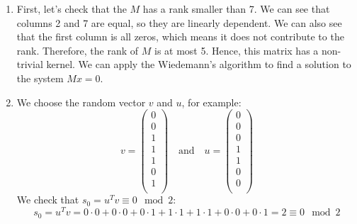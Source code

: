 \documentclass[a4paper, 11pt]{article}
\begin{document}
\begin{enumerate}
    \item First, let's check that the $M$ has a rank smaller than 7. We can see that columns 2 and 7 are equal, so they are linearly dependent. We can also see that the first column is all zeros, which means it does not contribute to the rank. Therefore, the rank of $M$ is at most 5. Hence, this matrix has a non-trivial kernel. We can apply the Wiedemann's algorithm to find a solution to the system $Mx = 0$.
    \item We choose the random vector $v$ and $u$, for example:
    \begin{equation}
        v = \begin{pmatrix}
            0 \\
            0 \\
            1 \\
            1 \\
            1 \\
            0 \\
            1 \\
        \end{pmatrix}
        \quad \text{and} \quad
        u = \begin{pmatrix}
            0 \\
            0 \\
            0 \\
            1 \\
            1 \\
            0 \\
            0 \\
        \end{pmatrix}
    \end{equation}
    We check that $s_0=u^Tv \equiv 0 \mod 2$:
    \begin{equation}
        s_0 = u^Tv = 0 \cdot 0 + 0 \cdot 0 + 0 \cdot 1 + 1 \cdot 1 + 1 \cdot 1 + 0 \cdot 0 + 0 \cdot 1 = 2 \equiv 0 \mod 2
    \end{equation}


\end{enumerate}
\end{document}
